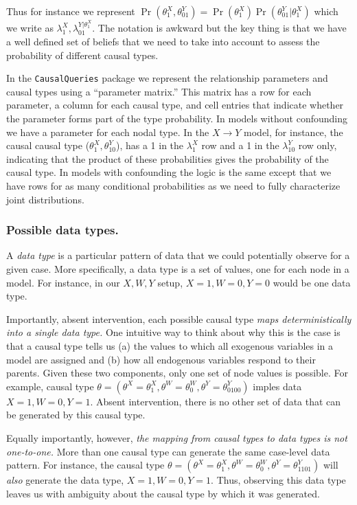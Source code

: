 \documentclass[
  12pt,
]{book}
\begin{document}
Thus for instance we represent \(\Pr(\theta^X_1, \theta^Y_{01}) = \Pr(\theta^X_1)\Pr(\theta^Y_{01}|\theta^X_1)\) which we write as \(\lambda^X_1, \lambda^{Y|\theta^X_1}_{01}\). The notation is awkward but the key thing is that we have a well defined set of beliefs that we need to take into account to assess the probability of different causal types.

In the \texttt{CausalQueries} package we represent the relationship parameters and causal types using a ``parameter matrix.'' This matrix has a row for each parameter, a column for each causal type, and cell entries that indicate whether the parameter forms part of the type probability. In models without confounding we have a parameter for each nodal type. In the \(X \rightarrow Y\) model, for instance, the causal causal type (\(\theta^X_1, \theta^Y_{10}\)), has a 1 in the \(\lambda^X_1\) row and a 1 in the \(\lambda^Y_{10}\) row only, indicating that the product of these probabilities gives the probability of the causal type. In models with confounding the logic is the same except that we have rows for as many conditional probabilities as we need to fully characterize joint distributions.

\hypertarget{possible-data-types.}{%
\subsubsection{Possible data types.}\label{possible-data-types.}}

A \emph{data type} is a particular pattern of data that we could potentially observe for a given case. More specifically, a data type is a set of values, one for each node in a model. For instance, in our \(X, W, Y\) setup, \(X=1, W=0, Y=0\) would be one data type.

Importantly, absent intervention, each possible causal type \emph{maps deterministically into a single data type.} One intuitive way to think about why this is the case is that a causal type tells us (a) the values to which all exogenous variables in a model are assigned and (b) how all endogenous variables respond to their parents. Given these two components, only one set of node values is possible. For example, causal type \(\theta = (\theta^X = \theta^X_1, \theta^W = \theta^W_0, \theta^Y = \theta^Y_{0100})\) imples data \(X=1, W=0, Y=1\). Absent intervention, there is no other set of data that can be generated by this causal type.

Equally importantly, however, \emph{the mapping from causal types to data types is not one-to-one.} More than one causal type can generate the same case-level data pattern. For instance, the causal type \(\theta = (\theta^X = \theta^X_1, \theta^W = \theta^W_0, \theta^Y = \theta^Y_{1101})\) will \emph{also} generate the data type, \(X=1, W=0, Y=1\). Thus, observing this data type leaves us with ambiguity about the causal type by which it was generated.
\end{document}
